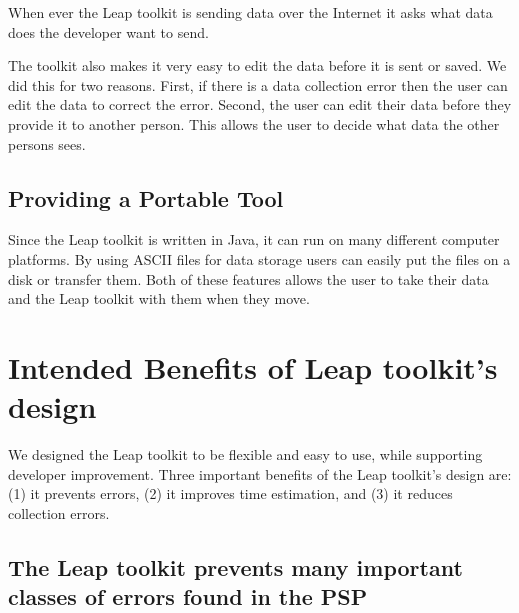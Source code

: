 When ever the Leap toolkit is
sending data over the Internet it asks what data does the developer want to
send.

The toolkit also makes it very easy to edit the data before it is sent or
saved. We did this for two reasons. First, if there is a data collection error
then the user can edit the data to correct the error. Second, the user can edit 
their data before they provide it to another person.  This allows the user to
decide what data the other persons sees.

\subsection{Providing a Portable Tool}

Since the Leap toolkit is written in Java, it can run on many different computer 
platforms.  By using ASCII files for data storage users can easily put the
files on a disk or transfer them.  Both of these features allows the user to
take their data and the Leap toolkit with them when they move.

\section{Intended Benefits of Leap toolkit's design}

We designed the Leap toolkit to be flexible and easy to use, while supporting
developer improvement.  Three important benefits of the Leap toolkit's design
are: (1) it prevents errors, (2) it improves time estimation, and (3) it
reduces collection errors.

\subsection{The Leap toolkit prevents many important classes of errors found in 
  the PSP}
\label{sec:leap-bene3}

